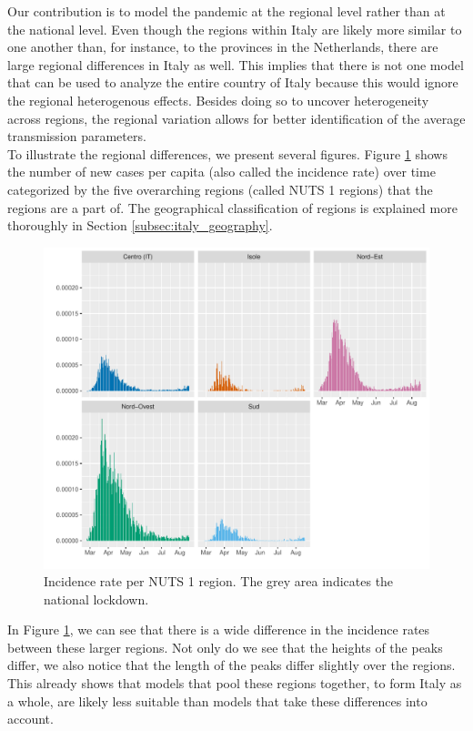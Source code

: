 \documentclass[12pt]{article}
\begin{document}
    Our contribution is to model the pandemic at the regional level rather than at the national level. Even though the regions within Italy are likely more similar to one another than, for instance, to the provinces in the Netherlands, there are large regional differences in Italy as well. This implies that there is not one model that can be used to analyze the entire country of Italy because this would ignore the regional heterogenous effects. Besides doing so to uncover heterogeneity across regions, the regional variation allows for better identification of the average transmission parameters. \\
	
	To illustrate the regional differences, we present several figures. Figure \ref{fig:incidence_per_NUTS1} shows the number of new cases per capita (also called the incidence rate) over time categorized by the five overarching regions (called NUTS 1 regions) that the regions are a part of. The geographical classification of regions is explained more thoroughly in Section \ref{subsec:italy_geography}.
	
	\begin{figure}[H]
	    \centering
	    \includegraphics[width=0.94\linewidth]{output/infective_rate_per_NUTS1.pdf}
	    \caption{Incidence rate per NUTS 1 region. The grey area indicates the national lockdown.}
	    \label{fig:incidence_per_NUTS1}
	\end{figure}
	
	In Figure \ref{fig:incidence_per_NUTS1}, we can see that there is a wide difference in the incidence rates between these larger regions. Not only do we see that the heights of the peaks differ, we also notice that the length of the peaks differ slightly over the regions. This already shows that models that pool these regions together, to form Italy as a whole, are likely less suitable than models that take these differences into account. \\
	
\end{document}
